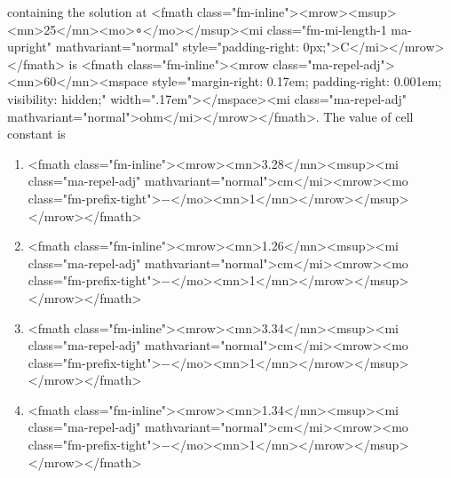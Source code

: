 \documentclass{article}
\begin{document}
containing the solution at <fmath class="fm-inline"><mrow><msup><mn>25</mn><mo>∘</mo></msup><mi class="fm-mi-length-1 ma-upright" mathvariant="normal" style="padding-right: 0px;">C</mi></mrow></fmath> is <fmath class="fm-inline"><mrow class="ma-repel-adj"><mn>60</mn><mspace style="margin-right: 0.17em; padding-right: 0.001em; visibility: hidden;" width=".17em">‌</mspace><mi class="ma-repel-adj" mathvariant="normal">ohm</mi></mrow></fmath>. The value of cell constant is\newline 
\begin{enumerate}[label=(\alph*)]
\item  <fmath class="fm-inline"><mrow><mn>3.28</mn><msup><mi class="ma-repel-adj" mathvariant="normal">cm</mi><mrow><mo class="fm-prefix-tight">−</mo><mn>1</mn></mrow></msup></mrow></fmath>
\item  <fmath class="fm-inline"><mrow><mn>1.26</mn><msup><mi class="ma-repel-adj" mathvariant="normal">cm</mi><mrow><mo class="fm-prefix-tight">−</mo><mn>1</mn></mrow></msup></mrow></fmath>
\item  <fmath class="fm-inline"><mrow><mn>3.34</mn><msup><mi class="ma-repel-adj" mathvariant="normal">cm</mi><mrow><mo class="fm-prefix-tight">−</mo><mn>1</mn></mrow></msup></mrow></fmath>
\item  <fmath class="fm-inline"><mrow><mn>1.34</mn><msup><mi class="ma-repel-adj" mathvariant="normal">cm</mi><mrow><mo class="fm-prefix-tight">−</mo><mn>1</mn></mrow></msup></mrow></fmath>
\end{enumerate}
\newpage
\end{document}
